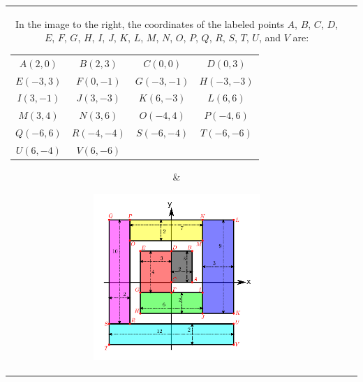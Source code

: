 \documentclass{article}
\begin{document}
\begin{tabular}{cc}
\parbox{0.5\textwidth}{
In the image to the right, the coordinates of the labeled points \(A\), \(B\), \(C\), \(D\), \(E\), \(F\), \(G\), \(H\), \(I\), \(J\), \(K\), \(L\), \(M\), \(N\), \(O\), \(P\), \(Q\), \(R\), \(S\), \(T\), \(U\), and \(V\) are:
\begin{tabular}{cccc}
\(A(2, 0)\) & \(B(2, 3)\) & \(C(0, 0)\) & \(D(0, 3)\) \\ 
\(E(-3, 3)\) & \(F(0, -1)\) & \(G(-3, -1)\) & \(H(-3, -3)\) \\ 
\(I(3, -1)\) & \(J(3, -3)\) & \(K(6, -3)\) & \(L(6, 6)\) \\
\(M(3, 4)\) & \(N(3, 6)\) & \(O(-4, 4)\) & \(P(-4, 6)\) \\
\(Q(-6, 6)\) & \(R(-4, -4)\) & \(S(-6, -4)\) & \(T(-6, -6)\) \\
\(U(6, -4)\) & \(V(6, -6)\)
\end{tabular}
} & \parbox{0.5\textwidth}{
\includegraphics[width = 0.5\textwidth]{Cartesian_coordinates_example}
}
\end{tabular}
\end{document}
